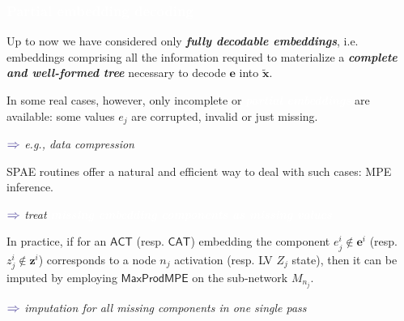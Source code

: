 \documentclass[xcolor={usenames,dvipsnames,svgnames}, compress]{beamer}
\newcommand{\highlighttext}[2][yellow]{{\colorbox{#1}{\textcolor{white}{#2}}}}
\begin{document}
\begin{frame}[t]
  \frametitle{\highlighttext[bgrey4]{Partial embedding decoding}}
  \footnotesize

  Up to now we have considered only \textbf{\emph{fully decodable embeddings}},
i.e. embeddings comprising all the information required to materialize a
\textbf{\emph{complete and well-formed 
tree}} necessary to decode $\mathbf{e}$ into $\tilde{\mathbf{x}}$.\par
%
In some real cases, however, only incomplete
or \highlighttext[tomato0]{\textbf{\emph{partial embeddings}}} are available: some
values $e_{j}$ are corrupted, invalid or just missing.
\begin{minipage}{1.0\linewidth}
      \raggedleft
      $\color{violet}\boldsymbol\Rightarrow$
      \scriptsize
     \emph{e.g., data compression}
   \end{minipage}\par\bigskip

SPAE routines offer a natural and efficient way to deal with such
cases: MPE inference.
\begin{minipage}{1.0\linewidth}
      \raggedleft
      $\color{violet}\boldsymbol\Rightarrow$
      \scriptsize
     \emph{treat \highlighttext[tomato0]{\emph{\textbf{missing embedding components as missing values}}}}
   \end{minipage}\par\bigskip

In practice, if for an $\mathsf{ACT}$ (resp. $\mathsf{CAT}$) embedding
the component $e_{j}^{i}\notin \mathbf{e}^{i}$ (resp. $z_{j}^{i}\notin \mathbf{z}^{i}$) 
corresponds to a node $n_{j}$ activation (resp. LV $Z_{j}$ state),
then it can be imputed
by employing
$\mathsf{MaxProdMPE}$ on the sub-network $M_{n_{j}}$.
\begin{minipage}{1.0\linewidth}
      \raggedleft
      $\color{violet}\boldsymbol\Rightarrow$
      \scriptsize
     \emph{imputation for all missing components in one single pass}
   \end{minipage}\par\bigskip

   
\end{frame}
\end{document}
